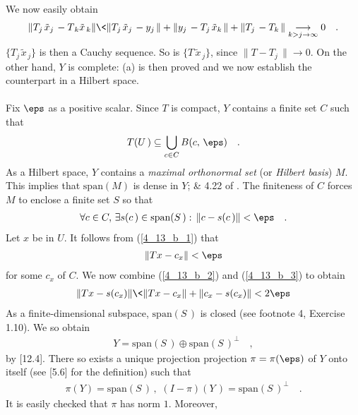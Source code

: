 We now easily obtain
\begin{align}\label{4_13_a_3}
\| T_{j\,} \tilde{x}_{j\,}  -T_{\, k} \tilde{x}_{\, k}\| \<
\| T_{j\,} \tilde{x}_{j\,}- y_{j\,}\| +
\| y_{j\,} -T_{j\,} \tilde{x}_{k\,}\| +
\| T_{j\,} - T_{ k\,}\|   \underset{k> j\to \infty}{\longrightarrow}0\quad .
\end{align}
$\{T_{ j\,} \tilde{x}_{\, j} \}$ is then a Cauchy sequence. So is $\{T \,\tilde{x}_{\, j}\}$, since $\| T-T_{j}\,\| \to 0$. On the other hand, $Y$ is complete: (a) is then proved and we now establish the counterpart in a Hilbert space.\\
\\
Fix $\eps$ as a positive scalar. Since $T$ is compact, $Y$ contains a finite set $C$ such that 
\begin{align}\label{4_13_b_1}
T(U\,)\subseteq \bigcup_{c\in C} B(c,\, \eps)\quad .
\end{align}
As a Hilbert space, $Y$ contains a \textsl{maximal orthonormal set} (or \textsl{Hilbert basis}) $M$. This implies that $\text{span}(M)$ is dense in $Y$;  \& 4.22 of \cite{Big_Rudin}. The finiteness of $C$ forces $M$ to enclose a finite set $S$ so that 
\begin{align}\label{4_13_b_2}
\forall c\in C, \, \exists  s(c\,) \in \text{span} (S\,):\, \|c - s(c\,)\| <\eps\quad .
\end{align}
Let $x$ be in $U$. It follows from (\ref{4_13_b_1}) that 
\begin{align}\label{4_13_b_3}
\|Tx - c_x \| < \eps
\end{align}
for some $c_x$ of $C$. We now combine (\ref{4_13_b_2}) and (\ref{4_13_b_3}) to obtain
\begin{align}
\|Tx - s(c_x) \| \<  \| Tx - c_x \| + \| c_x - s(c_x)\| < 2\eps
\end{align}
As a finite-dimensional subspace, $\text{span}(S\,)$ is closed (see footnote 4, Exercise 1.10). We so obtain
\begin{align}
Y=\text{span}(S\,)\oplus \text{span}(S\,)^\bot \quad ,
\end{align}
by [12.4]. There so exists a unique projection projection $\pi=\pi(\eps)$ of $Y$ onto itself (see [5.6] for the definition) such that
\begin{align}
\pi (Y) = \text{span}(S\,)\, ,\,  \,  (I-\pi)(Y\,) = \text{span}(S\,)^\bot\quad .
\end{align}
It is easily checked that $\pi$ has norm $1$. Moreover,
